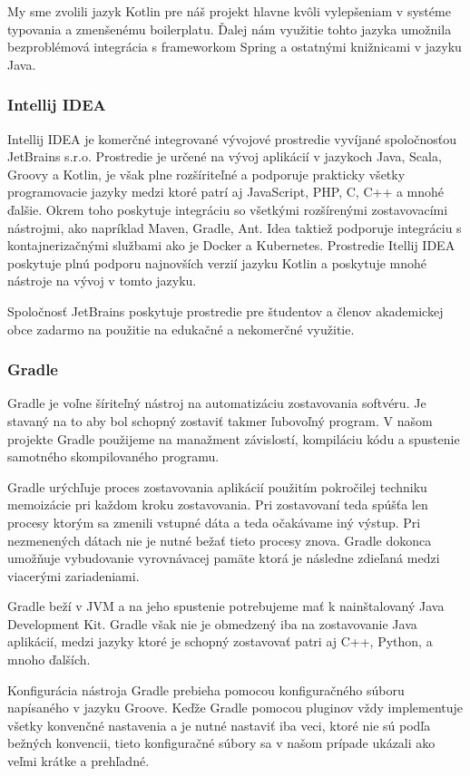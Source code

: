 My sme zvolili jazyk Kotlin pre náš projekt hlavne kvôli vylepšeniam v systéme typovania a zmenšenému boilerplatu. Ďalej nám využitie tohto jazyka umožnila bezproblémová integrácia s frameworkom Spring a ostatnými knižnicami v jazyku Java.	

\subsubsection{Intellij IDEA}
Intellij IDEA je komerčné integrované vývojové prostredie vyvíjané spoločnosťou JetBrains s.r.o. Prostredie je určené na vývoj aplikácií v jazykoch Java, Scala, Groovy a Kotlin, je však plne rozšíriteľné a podporuje prakticky všetky programovacie jazyky medzi ktoré patrí aj JavaScript, PHP, C, C++ a mnohé ďalšie. Okrem toho poskytuje integráciu so všetkými rozšírenými zostavovacími nástrojmi, ako napríklad Maven, Gradle, Ant. Idea taktiež podporuje integráciu s kontajnerizačnými službami ako je Docker a Kubernetes. Prostredie Itellij IDEA poskytuje plnú podporu najnovších verzií jazyku Kotlin a poskytuje mnohé nástroje na vývoj v tomto jazyku.

Spoločnosť JetBrains poskytuje prostredie pre študentov a členov akademickej obce zadarmo na použitie na edukačné a nekomerčné využitie. 


\subsubsection{Gradle}
Gradle je voľne šíriteľný nástroj na automatizáciu zostavovania softvéru. Je stavaný na to aby bol schopný zostaviť takmer ľubovoľný program.  V našom projekte Gradle použijeme na manažment závislostí, kompiláciu kódu a spustenie samotného skompilovaného programu. 

Gradle urýchľuje proces zostavovania aplikácií použitím pokročilej techniku memoizácie pri každom kroku zostavovania. Pri zostavovaní teda spúšťa len procesy ktorým sa zmenili vstupné dáta  a teda očakávame iný výstup. Pri nezmenených dátach nie je nutné bežať tieto procesy znova. Gradle dokonca umožňuje vybudovanie vyrovnávacej pamäte ktorá je následne zdieľaná medzi viacerými zariadeniami.

Gradle beží v JVM a na jeho spustenie potrebujeme mať k nainštalovaný Java Development Kit. Gradle však nie je obmedzený iba na zostavovanie Java aplikácií, medzi jazyky ktoré je schopný zostavovať patri aj C++, Python, a mnoho ďalších.

Konfigurácia nástroja Gradle prebieha pomocou konfiguračného súboru napísaného v jazyku Groove. Keďže Gradle pomocou pluginov vždy implementuje všetky konvenčné nastavenia a je nutné nastaviť iba veci, ktoré nie sú podľa bežných konvencii, tieto konfiguračné  súbory sa v našom prípade ukázali ako veľmi krátke a prehľadné. 

